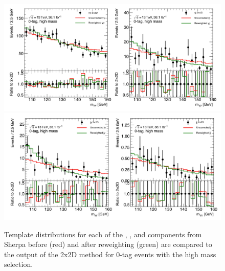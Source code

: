 \begin{figure}[!htb]
  \centering
  \includegraphics[width=\textwidth]{chapters/chapter5_yybb/images/2x2d/high_mass_1_clean.pdf}\\
  \includegraphics[width=\textwidth]{chapters/chapter5_yybb/images/2x2d/high_mass_2_clean.pdf}
  \caption[Template distributions for each of the \yy, \yj, \jy and \jj components before and after reweighting compared to the output of the 2x2D method for 0-tag events with the high mass selection]{Template distributions for each of the \yy, \yj, \jy and \jj components from Sherpa before (red) and after reweighting (green) are compared to the output of the 2x2D method for 0-tag events with the high mass selection.
    \label{fig:2x2D_templates_highMass}}
\end{figure}


